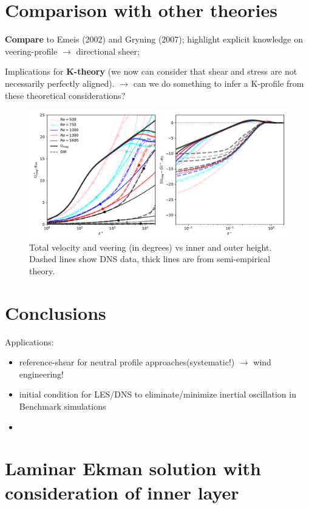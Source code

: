 \documentclass[a4paper,11pt]{article}
\begin{document}
\section{Comparison with other theories}

\textbf{Compare} to Emeis (2002) and Gryning (2007); highlight explicit knowledge on veering-profile $\rightarrow$ directional sheer;
%
\par%
%
Implications for \textbf{K-theory} (we now can consider that shear and stress are not necessarily perfectly aligned).
$\rightarrow$ can we do something to infer a K-profile from these theoretical considerations? 
%
\begin{figure}
  \includegraphics[width=\textwidth]{../plot/mag_dir.pdf} 
  \caption{Total velocity and veering (in degrees) vs inner and outer height.
    Dashed lines show DNS data, thick lines are from semi-empirical theory.} 
\end{figure} 
%
\section{Conclusions}
%
Applications:
\begin{itemize}
\item reference-shear for neutral profile approaches(systematic!) $\rightarrow$ wind engineering! 
\item initial condition for LES/DNS to eliminate/minimize inertial oscillation in Benchmark simulations
\item
\end{itemize} 

\appendix

\section{Laminar Ekman solution with consideration of inner layer}
\end{document}

